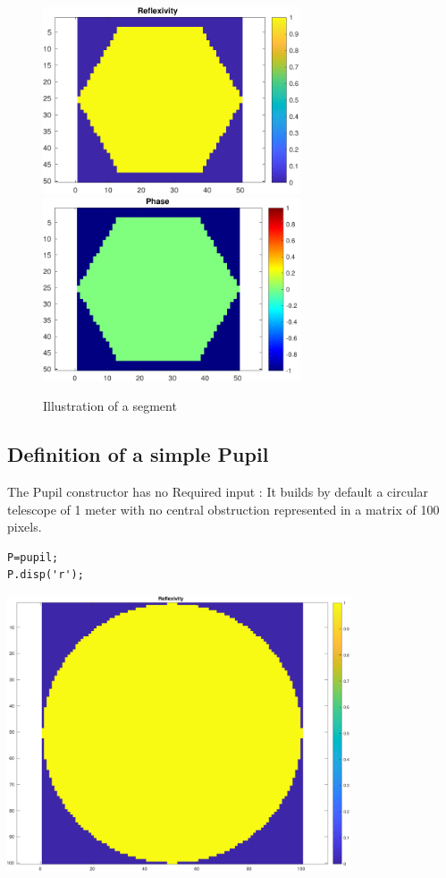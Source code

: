 \documentclass[12pt]{article}
\begin{document}
\begin{figure}
	\centering
	\includegraphics [width=3in]{docuPupilClass_01.pdf} \hspace{0.5cm}
	\includegraphics [width=3in]{docuPupilClass_02.pdf}
	\caption{Illustration of a segment}
\end{figure}



\subsection{Definition of a simple Pupil}

\begin{par}
The Pupil constructor has no Required input : It builds by default a circular telescope of 1 meter with no central obstruction represented in a matrix of 100 pixels.
\end{par} \vspace{1em}
\begin{verbatim}
P=pupil;
P.disp('r');
\end{verbatim}

\includegraphics [width=4in]{docuPupilClass_03.pdf}
\end{document}
